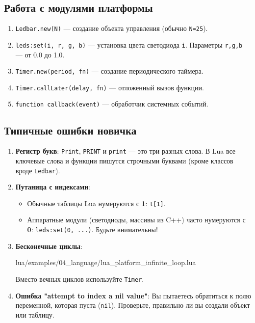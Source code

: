 \subsection{Работа с модулями платформы}
\begin{enumerate}
    \item \verb|Ledbar.new(N)| — создание объекта управления (обычно \verb|N=25|).
    \item \verb|leds:set(i, r, g, b)| — установка цвета светодиода \verb|i|. Параметры \verb|r,g,b| — от 0.0 до 1.0.
    \item \verb|Timer.new(period, fn)| — создание периодического таймера.
    \item \verb|Timer.callLater(delay, fn)| — отложенный вызов функции.
    \item \verb|function callback(event)| — обработчик системных событий.
\end{enumerate}

\subsection{Типичные ошибки новичка}
\begin{enumerate}
    \item \textbf{Регистр букв}: \texttt{Print}, \texttt{PRINT} и \texttt{print} — это три разных слова. В Lua все ключевые слова и функции пишутся строчными буквами (кроме классов вроде \texttt{Ledbar}).
    \item \textbf{Путаница с индексами}:
    \begin{itemize}
        \item Обычные таблицы Lua нумеруются с \textbf{1}: \texttt{t[1]}.
        \item Аппаратные модули (светодиоды, массивы из C++) часто нумеруются с \textbf{0}: \texttt{leds:set(0, ...)}. Будьте внимательны!
    \end{itemize}
    \item \textbf{Бесконечные циклы}:
    \begin{codefile}{lua/examples/04_language/lua_platform_infinite_loop.lua}
    \end{codefile}
    Вместо вечных циклов используйте \texttt{Timer}.
    \item \textbf{Ошибка "attempt to index a nil value"}: Вы пытаетесь обратиться к полю переменной, которая пуста (\texttt{nil}). Проверьте, правильно ли вы создали объект или таблицу.
\end{enumerate}

